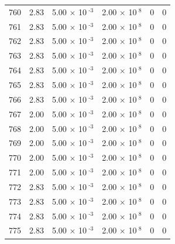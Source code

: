 \documentclass[a4paper,11pt]{article}
\begin{document}
\begin{center}
\begin{longtable}{|R{1.5cm}|R{2.4cm}|R{2.4cm}|R{2.4cm}|R{2.4cm}|R{2.4cm}|}
  760 &   2.83  &         5.00 $\times$ 10$^{\text{          -3}}$  &         2.00 $\times$ 10$^{\text{           8}}$  & 0  & 0 \\
  761 &   2.83  &         5.00 $\times$ 10$^{\text{          -3}}$  &         2.00 $\times$ 10$^{\text{           8}}$  & 0  & 0 \\
  762 &   2.83  &         5.00 $\times$ 10$^{\text{          -3}}$  &         2.00 $\times$ 10$^{\text{           8}}$  & 0  & 0 \\
  763 &   2.83  &         5.00 $\times$ 10$^{\text{          -3}}$  &         2.00 $\times$ 10$^{\text{           8}}$  & 0  & 0 \\
  764 &   2.83  &         5.00 $\times$ 10$^{\text{          -3}}$  &         2.00 $\times$ 10$^{\text{           8}}$  & 0  & 0 \\
  765 &   2.83  &         5.00 $\times$ 10$^{\text{          -3}}$  &         2.00 $\times$ 10$^{\text{           8}}$  & 0  & 0 \\
  766 &   2.83  &         5.00 $\times$ 10$^{\text{          -3}}$  &         2.00 $\times$ 10$^{\text{           8}}$  & 0  & 0 \\
  767 &   2.00  &         5.00 $\times$ 10$^{\text{          -3}}$  &         2.00 $\times$ 10$^{\text{           8}}$  & 0  & 0 \\
  768 &   2.00  &         5.00 $\times$ 10$^{\text{          -3}}$  &         2.00 $\times$ 10$^{\text{           8}}$  & 0  & 0 \\
  769 &   2.00  &         5.00 $\times$ 10$^{\text{          -3}}$  &         2.00 $\times$ 10$^{\text{           8}}$  & 0  & 0 \\
  770 &   2.00  &         5.00 $\times$ 10$^{\text{          -3}}$  &         2.00 $\times$ 10$^{\text{           8}}$  & 0  & 0 \\
  771 &   2.00  &         5.00 $\times$ 10$^{\text{          -3}}$  &         2.00 $\times$ 10$^{\text{           8}}$  & 0  & 0 \\
  772 &   2.83  &         5.00 $\times$ 10$^{\text{          -3}}$  &         2.00 $\times$ 10$^{\text{           8}}$  & 0  & 0 \\
  773 &   2.83  &         5.00 $\times$ 10$^{\text{          -3}}$  &         2.00 $\times$ 10$^{\text{           8}}$  & 0  & 0 \\
  774 &   2.83  &         5.00 $\times$ 10$^{\text{          -3}}$  &         2.00 $\times$ 10$^{\text{           8}}$  & 0  & 0 \\
  775 &   2.83  &         5.00 $\times$ 10$^{\text{          -3}}$  &         2.00 $\times$ 10$^{\text{           8}}$  & 0  & 0 \\

\end{longtable}
\end{center}
\end{document}
